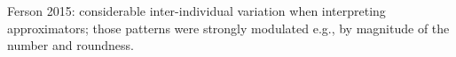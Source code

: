 \documentclass[11pt,a4paper]{article}
\begin{document}
Ferson 2015: considerable inter-individual variation when interpreting approximators; those patterns were strongly modulated e.g., by magnitude of the number and roundness.











\end{document}

